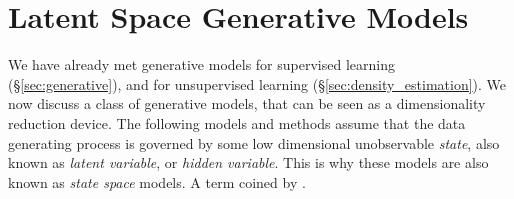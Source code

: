 %
%
%


\begin{remark}
\end{remark}








\section{Latent Space Generative Models}
\label{sec:latent_space}

We have already met generative models for supervised learning (\S\ref{sec:generative}), and for unsupervised learning (\S\ref{sec:density_estimation}).
We now discuss a class of generative models, that can be seen as a dimensionality reduction device. 
The following models and methods assume that the data generating process is governed by some low dimensional unobservable \emph{state}, also known as \emph{latent variable}, or \emph{hidden variable}.
This is why these models are also known as \emph{state space} models. A term coined by  \citet{kalman_contributions_1960}.

